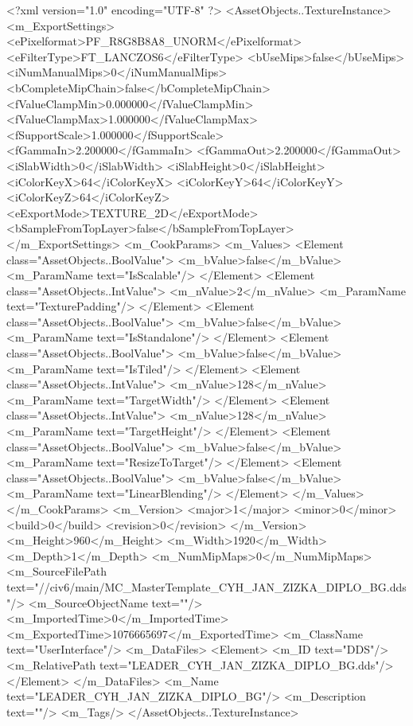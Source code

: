 <?xml version="1.0" encoding="UTF-8" ?>
<AssetObjects..TextureInstance>
	<m_ExportSettings>
		<ePixelformat>PF_R8G8B8A8_UNORM</ePixelformat>
		<eFilterType>FT_LANCZOS6</eFilterType>
		<bUseMips>false</bUseMips>
		<iNumManualMips>0</iNumManualMips>
		<bCompleteMipChain>false</bCompleteMipChain>
		<fValueClampMin>0.000000</fValueClampMin>
		<fValueClampMax>1.000000</fValueClampMax>
		<fSupportScale>1.000000</fSupportScale>
		<fGammaIn>2.200000</fGammaIn>
		<fGammaOut>2.200000</fGammaOut>
		<iSlabWidth>0</iSlabWidth>
		<iSlabHeight>0</iSlabHeight>
		<iColorKeyX>64</iColorKeyX>
		<iColorKeyY>64</iColorKeyY>
		<iColorKeyZ>64</iColorKeyZ>
		<eExportMode>TEXTURE_2D</eExportMode>
		<bSampleFromTopLayer>false</bSampleFromTopLayer>
	</m_ExportSettings>
	<m_CookParams>
		<m_Values>
			<Element class="AssetObjects..BoolValue">
				<m_bValue>false</m_bValue>
				<m_ParamName text="IsScalable"/>
			</Element>
			<Element class="AssetObjects..IntValue">
				<m_nValue>2</m_nValue>
				<m_ParamName text="TexturePadding"/>
			</Element>
			<Element class="AssetObjects..BoolValue">
				<m_bValue>false</m_bValue>
				<m_ParamName text="IsStandalone"/>
			</Element>
			<Element class="AssetObjects..BoolValue">
				<m_bValue>false</m_bValue>
				<m_ParamName text="IsTiled"/>
			</Element>
			<Element class="AssetObjects..IntValue">
				<m_nValue>128</m_nValue>
				<m_ParamName text="TargetWidth"/>
			</Element>
			<Element class="AssetObjects..IntValue">
				<m_nValue>128</m_nValue>
				<m_ParamName text="TargetHeight"/>
			</Element>
			<Element class="AssetObjects..BoolValue">
				<m_bValue>false</m_bValue>
				<m_ParamName text="ResizeToTarget"/>
			</Element>
			<Element class="AssetObjects..BoolValue">
				<m_bValue>false</m_bValue>
				<m_ParamName text="LinearBlending"/>
			</Element>
		</m_Values>
	</m_CookParams>
	<m_Version>
		<major>1</major>
		<minor>0</minor>
		<build>0</build>
		<revision>0</revision>
	</m_Version>
	<m_Height>960</m_Height>
	<m_Width>1920</m_Width>
	<m_Depth>1</m_Depth>
	<m_NumMipMaps>0</m_NumMipMaps>
	<m_SourceFilePath text="//civ6/main/MC_MasterTemplate\Textures\LEADER_CYH_JAN_ZIZKA_DIPLO_BG.dds"/>
	<m_SourceObjectName text=""/>
	<m_ImportedTime>0</m_ImportedTime>
	<m_ExportedTime>1076665697</m_ExportedTime>
	<m_ClassName text="UserInterface"/>
	<m_DataFiles>
		<Element>
			<m_ID text="DDS"/>
			<m_RelativePath text="LEADER_CYH_JAN_ZIZKA_DIPLO_BG.dds"/>
		</Element>
	</m_DataFiles>
	<m_Name text="LEADER_CYH_JAN_ZIZKA_DIPLO_BG"/>
	<m_Description text=""/>
	<m_Tags/>
</AssetObjects..TextureInstance>

